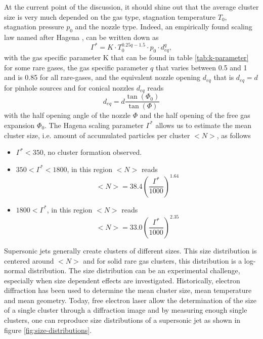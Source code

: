 At the current point of the discussion, it should shine out that the average cluster size is very much depended on the gas type, stagnation temperature $T_{0}$, stagnation pressure $p_{0}$ and the nozzle type. Indeed, an empirically found scaling law named after Hagena \cite{Hagena-1972-JCP,Hagena-1981-SurfSci,Hagena-1987-ZeitschriftAMC}, can be written down as
\begin{equation}
\Gamma^{*} = K \cdot T_{0}^{0.25q-1.5} \cdot p_{0} \cdot d_{eq}^{q},
\label{eq:Hagena-parameter}
\end{equation}
with the gas specific parameter K that can be found in table \ref{tab:k-parameter} for some rare gases, the gas specific parameter $q$ that varies between 0.5 and 1 and is 0.85 for all rare-gases, and the equivalent nozzle opening $d_{eq}$ that is $d_{eq}=d$ for pinhole sources and for conical nozzles $d_{eq}$ reads
\begin{equation}
d_{eq} = d\frac{\tan\left(\Phi_{0}\right)}{\tan\left(\Phi\right)}
\label{eq:equivalent-nozzle-opening}
\end{equation}
with the half opening angle of the nozzle $\Phi$ and the half opening of the free gas expansion $\Phi_{0}$. The Hagena scaling parameter $\Gamma^{*}$ allows us to estimate the mean cluster size, i.e. amount of accumulated particles per cluster $<N>$, as follows
\begin{itemize}
	\item $\Gamma^{*} < 350$, no cluster formation observed.
	\item $350 < \Gamma^{*} < 1800$, in this region $<N>$ reads
		\begin{equation}
		<N> = 38.4 \left(\frac{\Gamma^{*}}{1000}\right)^{1.64}
		\label{eq:intermediate-hagena-scaling}
		\end{equation}
	\item $1800 < \Gamma^{*}$, in this region $<N>$ reads
		\begin{equation}
		<N> = 33.0 \left(\frac{\Gamma^{*}}{1000}\right)^{2.35}
		\label{eq:large-hagena-scaling}
		\end{equation}
\end{itemize}
Supersonic jets generally create clusters of different sizes. This size distribution is centered around $<N>$ and for solid rare gas clusters, this distribution is a log-normal distribution. The size distribution can be an experimental challenge, especially when size dependent effects are investigated. Historically, electron diffraction \cite{Farges-1981-SurfSci,Bartell-1986-ChemRev} has been used to determine the mean cluster size, mean temperature and mean geometry. Today, free electron laser allow the determination of the size of a single cluster through a diffraction image and by measuring enough single clusters, one can reproduce size distributions of a supersonic jet as shown in figure \ref{fig:size-distributions}.\\
